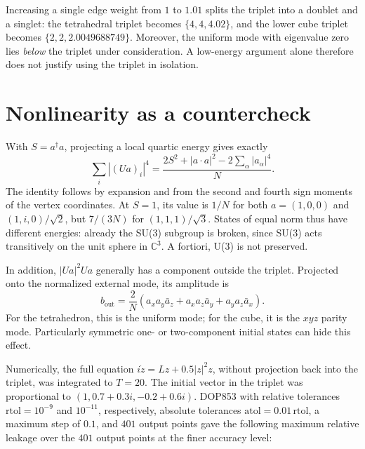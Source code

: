 \documentclass[a4paper,11pt]{article}
\newcommand{\C}{\mathbb C}
\begin{document}
Increasing a single edge weight from $1$ to $1.01$ splits the triplet into a doublet and a singlet: the tetrahedral triplet becomes $\{4,4,4.02\}$, and the lower cube triplet becomes $\{2,2,2.0049688749\}$. Moreover, the uniform mode with eigenvalue zero lies \emph{below} the triplet under consideration. A low-energy argument alone therefore does not justify using the triplet in isolation.

\section{Nonlinearity as a countercheck}\label{sec:nonlinearity}
With $S=a^\dagger a$, projecting a local quartic energy gives exactly
\begin{equation}\label{eq:quartic}
\sum_i|(Ua)_i|^4=\frac{2S^2+|a\cdot a|^2-2\sum_\alpha|a_\alpha|^4}{N}.
\end{equation}
The identity follows by expansion and from the second and fourth sign moments of the vertex coordinates. At $S=1$, its value is $1/N$ for both $a=(1,0,0)$ and $(1,i,0)/\sqrt2$, but $7/(3N)$ for $(1,1,1)/\sqrt3$. States of equal norm thus have different energies: already the SU(3) subgroup is broken, since SU(3) acts transitively on the unit sphere in $\C^3$. A fortiori, U(3) is not preserved.

In addition, $|Ua|^2Ua$ generally has a component outside the triplet. Projected onto the normalized external mode, its amplitude is
\begin{equation}\label{eq:external}
b_{\mathrm{out}}=\frac{2}{N}(a_xa_y\bar a_z+a_xa_z\bar a_y+a_ya_z\bar a_x).
\end{equation}
For the tetrahedron, this is the uniform mode; for the cube, it is the $xyz$ parity mode. Particularly symmetric one- or two-component initial states can hide this effect.

Numerically, the full equation $i\dot z=Lz+0.5|z|^2z$, without projection back into the triplet, was integrated to $T=20$. The initial vector in the triplet was proportional to $(1,0.7+0.3i,-0.2+0.6i)$. DOP853 with relative tolerances $\mathrm{rtol}=10^{-9}$ and $10^{-11}$, respectively, absolute tolerances $\mathrm{atol}=0.01\,\mathrm{rtol}$, a maximum step of $0.1$, and $401$ output points gave the following maximum relative leakage over the $401$ output points at the finer accuracy level:
\end{document}
